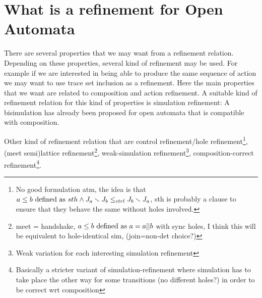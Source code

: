\documentclass{article}
\begin{document}
\section{What is a refinement for Open Automata}
There are several properties that we may want from a refinement relation.
Depending on these properties, several kind of refinement may be used.
For example if we are interested in being able to produce the same sequence of action we may want to use trace set inclusion as a refinement.
Here the main properties that we want are related to composition and action refinement.
A suitable kind of refinement relation for this kind of properties is simulation refinement:
A bisimulation has already been proposed for open automata  that is compatible with composition.

Other kind of refinement relation that  are control refinement/hole refinement\footnote{No good formulation atm, the idea is that \(a \leq b \text{ defined as } sth \wedge J_a \smallsetminus J_b \leq_{ctrl} J_b \smallsetminus J_a\), sth is probably a clause to ensure that they behave the same without holes involved.}, (meet semi)lattice refinement\footnote{meet = handshake, \(a \leq b \text{ defined as } a = a || b\) with sync holes, I think this will be equivalent to hole-identical sim, (join=non-det choice?)}, weak-simulation refinement\footnote{Weak variation for each interesting simulation refinement}, composition-correct refinement\footnote{Basically a stricter variant of simulation-refinement where simulation has to take place the other way for some transitions (no different holes?) in order to be correct wrt composition}.
\end{document}
